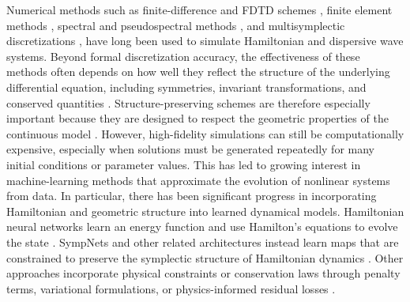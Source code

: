 \documentclass[11pt,a4paper]{article}
\theoremstyle{definition}
\theoremstyle{remark}
\numberwithin{equation}{section}
\numberwithin{figure}{section}
\numberwithin{table}{section}
\begin{document}
Numerical methods such as finite-difference and FDTD schemes
\cite{Yee1966, bokil2018highFDTD, gibson2026analysis},
finite element methods \cite{banks2009finiteElement,monk2003finiteElement},
spectral and pseudospectral methods \cite{trefethen2000spectral,fornberg1996pseudospectral},
and multisymplectic discretizations
\cite{bridges2001multisymplecticSpectral,chen2001multi,chen2011multi},
have long been used to simulate Hamiltonian and dispersive wave systems. Beyond formal discretization accuracy, the effectiveness of these methods often depends on how well they reflect the structure of the underlying differential equation, including symmetries, invariant transformations, and conserved quantities \cite{oguadimma2026foundational}.
Structure-preserving schemes are therefore especially important because they are designed to respect the geometric properties of the continuous model
\cite{obieke2026energy,chen2011multi}.
However, high-fidelity simulations can still be computationally expensive, especially when solutions must be generated repeatedly for many initial conditions or parameter values. This has led to growing interest in machine-learning methods that approximate the evolution of nonlinear systems from data. In particular, there has been significant progress in incorporating Hamiltonian and geometric structure into learned dynamical models. Hamiltonian neural networks learn an energy function and use Hamilton's equations to evolve the state \cite{greydanus2019hamiltonian}. SympNets and other related architectures instead learn maps that are constrained to preserve the symplectic structure of Hamiltonian dynamics \cite{jin2020sympnets,burby2021normal}. Other approaches incorporate physical constraints or conservation laws through penalty terms, variational formulations, or physics-informed residual losses \cite{raissi2019physics,kissas2020machine,chen2022kam,zhang2022vanishing}.
\end{document}
